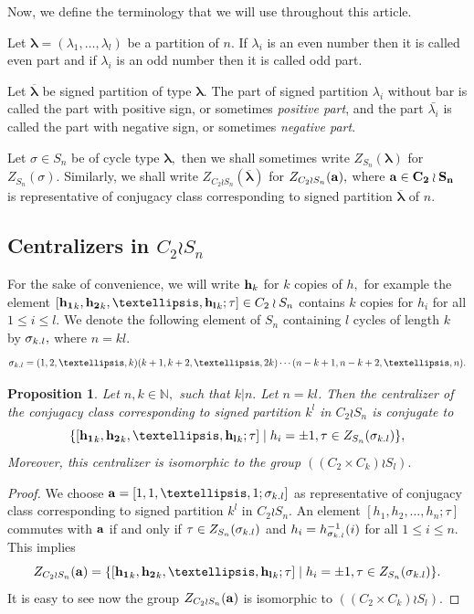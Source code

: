\documentclass[12pt,twoside,reqno]{amsart}
\newtheorem{proposition}[theorem]{Proposition}
\theoremstyle{definition}
\numberwithin{equation}{section}
\newcommand{\lbd}{\lambda}
\newcommand{\Lbd}{\bm {\lambda}}
\begin{document}
Now, we define the terminology that we will use throughout this article. 

Let $\Lbd = (\lbd_1, \ldots, \lbd_l)$ be a partition of $n$. If $\lambda_i$ is an even number then it is called even part and if $\lambda_i$ is an odd number then it is called odd part. 

Let $\overline{\Lbd}$ be signed partition of type $\Lbd.$
The part of signed partition $\lambda_i$ without bar is called the part with positive sign, or sometimes \emph{positive part}, and the part $\bar{\lambda_i}$ is called the part with negative sign, or sometimes \emph{negative part}.

Let $\sigma\in S_n$ be of cycle type $\Lbd,$ then we shall sometimes write $Z_{S_n}(\Lbd)$ for  $Z_{S_n}(\sigma).$ Similarly, we shall write  $Z_{C_2 \wr S_n}(\overline{\Lbd})$
for $Z_{C_2 \wr S_n}({\bf a}), $ where $\bf a\in C_2 \wr S_n$ is representative of conjugacy class corresponding to signed partition $\overline{\Lbd}$ of $n.$

\subsection{Centralizers in $C_2 \wr S_n$}
For the sake of convenience, we will write ${\bf h}_k$ for $k$ copies of $h,$ for example the element $[{\bf h_1}_k,{\bf h_2}_k,\ldots, {\bf h_l}_k;\tau] \in C_2 \wr S_n$ contains $k$ copies for $h_i$ for all $1\leq i\leq l.$ We denote the following element of $S_n$ containing $l$ cycles of length $k$ by ${\bf \sigma}_{k.l},$ where $n=kl.$
$${\bf \sigma}_{k.l} = (1,2,\ldots, k)(k+1,k+2, \ldots, 2k)\cdots (n-k+1, n-k+2,\ldots, n).$$ 
\begin{proposition}\label{prop_kl}
Let $n,k \in \mathbb N,$ such that $k|n.$  Let $n = kl$. Then the centralizer of the conjugacy class corresponding to signed partition $k^l$ in $C_2 \wr S_n$ is conjugate to 
$$ \{[{\bf h_1}_k,{\bf h_2}_k,\ldots, {\bf h_l}_k;\tau]\mid h_i = \pm1, \tau\in Z_{S_n}({\bf \sigma}_{k.l}) \},$$ 
Moreover, this centralizer is isomorphic to the group $((C_2\times C_k)\wr S_l).$
\end{proposition}
\begin{proof}
We choose ${\bf a} =[1,1,\ldots, 1 ; {\bf \sigma}_{k.l}]$ as representative of conjugacy class  corresponding to signed partition $k^l$ in $C_2 \wr S_n.$ An element $[h_1, h_2, \ldots, h_n ; \tau]$ commutes with ${\bf a}$ if and only if $\tau \in Z_{S_n}({\bf \sigma}_{k.l})$ and $h_i=h_{{\bf \sigma}_{k.l}}^{-1}(i)$ for all $1\leq i\leq n.$ This implies 
$$Z_{C_2 \wr S_n}({\bf a})= \{[{\bf h_1}_k,{\bf h_2}_k,\ldots, {\bf h_l}_k;\tau]\mid h_i = \pm1, \tau\in Z_{S_n}({\bf \sigma}_{k.l}) \}.$$ It is easy to see now the group $Z_{C_2 \wr S_n}({\bf a})$ is isomorphic to 
$((C_2\times C_k)\wr S_l).$

\end{proof}
\end{document}
